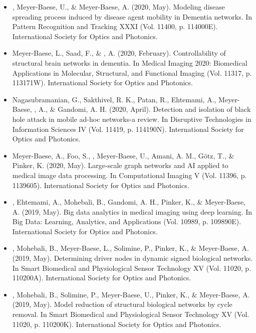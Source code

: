 \documentclass[]{template}
\begin{document}
\begin{itemize}
\item {}, Meyer-Baese, U., \& Meyer-Baese, A. (2020, May). Modeling disease spreading process induced by disease agent mobility in Dementia networks. In Pattern Recognition and Tracking XXXI (Vol. 11400, p. 114000E). International Society for Optics and Photonics.

\item Meyer-Baese, L., Saad, F., \& , A. (2020, February). Controllability of structural brain networks in dementia. In Medical Imaging 2020: Biomedical Applications in Molecular, Structural, and Functional Imaging (Vol. 11317, p. 113171W). International Society for Optics and Photonics.

\item Nagasubramanian, G., Sakthivel, R. K., Patan, R., Ehtemami, A., Meyer-Baese, , A., \& Gandomi, A. H. (2020, April). Detection and isolation of black hole attack in mobile ad-hoc networks-a review. In Disruptive Technologies in Information Sciences IV (Vol. 11419, p. 114190N). International Society for Optics and Photonics.

\item Meyer-Baese, A., Foo, S., , Meyer-Baese, U., Amani, A. M., Götz, T., \& Pinker, K. (2020, May). Large-scale graph networks and AI applied to medical image data processing. In Computational Imaging V (Vol. 11396, p. 1139605). International Society for Optics and Photonics.

\item {}, Ehtemami, A., Mohebali, B., Gandomi, A. H., Pinker, K., \& Meyer-Baese, A. (2019, May). Big data analytics in medical imaging using deep learning. In Big Data: Learning, Analytics, and Applications (Vol. 10989, p. 109890E). International Society for Optics and Photonics.

\item {}, Mohebali, B., Meyer-Baese, L., Solimine, P., Pinker, K., \& Meyer-Baese, A. (2019, May). Determining driver nodes in dynamic signed biological networks. In Smart Biomedical and Physiological Sensor Technology XV (Vol. 11020, p. 110200A). International Society for Optics and Photonics.

\item {}, Mohebali, B., Solimine, P., Meyer-Baese, U., Pinker, K., \& Meyer-Baese, A. (2019, May). Model reduction of structural biological networks by cycle removal. In Smart Biomedical and Physiological Sensor Technology XV (Vol. 11020, p. 110200K). International Society for Optics and Photonics.


\end{itemize}
\end{document}
